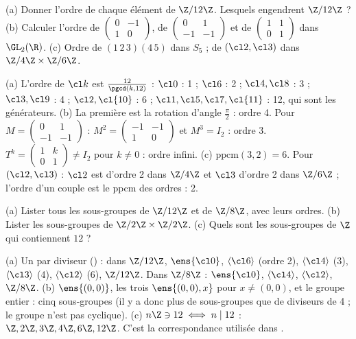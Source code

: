 \begin{exo}
(a) Donner l'ordre de chaque élément de $\Z/12\Z$. Lesquels engendrent $\Z/12\Z$ ? (b) Calculer l'ordre de $\begin{pmatrix}0&-1\\1&0\end{pmatrix}$, de $\begin{pmatrix}0&1\\-1&-1\end{pmatrix}$ et de $\begin{pmatrix}1&1\\0&1\end{pmatrix}$ dans $\GL_2(\R)$. (c) Ordre de $(1\,2\,3)(4\,5)$ dans $S_5$ ; de $(\cl2,\cl3)$ dans $\Z/4\Z\times\Z/6\Z$.
\begin{corrige}
(a) L'ordre de $\cl k$ est $\frac{12}{\pgcd(k,12)}$ : $\cl0$ : 1 ; $\cl6$ : 2 ; $\cl4,\cl8$ : 3 ; $\cl3,\cl9$ : 4 ; $\cl2,\cl{10}$ : 6 ; $\cl1,\cl5,\cl7,\cl{11}$ : 12, qui sont les générateurs.
(b) La première est la rotation d'angle $\frac\pi2$ : ordre 4. Pour $M=\begin{pmatrix}0&1\\-1&-1\end{pmatrix}$ : $M^2=\begin{pmatrix}-1&-1\\1&0\end{pmatrix}$ et $M^3=I_2$ : ordre 3. $T^k=\begin{pmatrix}1&k\\0&1\end{pmatrix}\neq I_2$ pour $k\neq0$ : ordre infini.
(c) $\mathrm{ppcm}(3,2)=6$. Pour $(\cl2,\cl3)$ : $\cl2$ est d'ordre 2 dans $\Z/4\Z$ et $\cl3$ d'ordre 2 dans $\Z/6\Z$ ; l'ordre d'un couple est le ppcm des ordres : 2.
\end{corrige}
\end{exo}
\begin{exo}
(a) Lister tous les sous-groupes de $\Z/12\Z$ et de $\Z/8\Z$, avec leurs ordres. (b) Lister les sous-groupes de $\Z/2\Z\times\Z/2\Z$. (c) Quels sont les sous-groupes de $\Z$ qui contiennent $12$ ?
\begin{corrige}
(a) Un par diviseur () : dans $\Z/12\Z$, $\ens{\cl0}$, $\langle\cl6\rangle$ (ordre 2), $\langle\cl4\rangle$ (3), $\langle\cl3\rangle$ (4), $\langle\cl2\rangle$ (6), $\Z/12\Z$. Dans $\Z/8\Z$ : $\ens{\cl0}$, $\langle\cl4\rangle$, $\langle\cl2\rangle$, $\Z/8\Z$.
(b) $\ens{(0,0)}$, les trois $\ens{(0,0),x}$ pour $x\neq(0,0)$, et le groupe entier : cinq sous-groupes (il y a donc plus de sous-groupes que de diviseurs de 4 ; le groupe n'est pas cyclique).
(c) $n\Z\ni12\iff n\mid12$ : $\Z,2\Z,3\Z,4\Z,6\Z,12\Z$. C'est la correspondance utilisée dans .
\end{corrige}
\end{exo}
